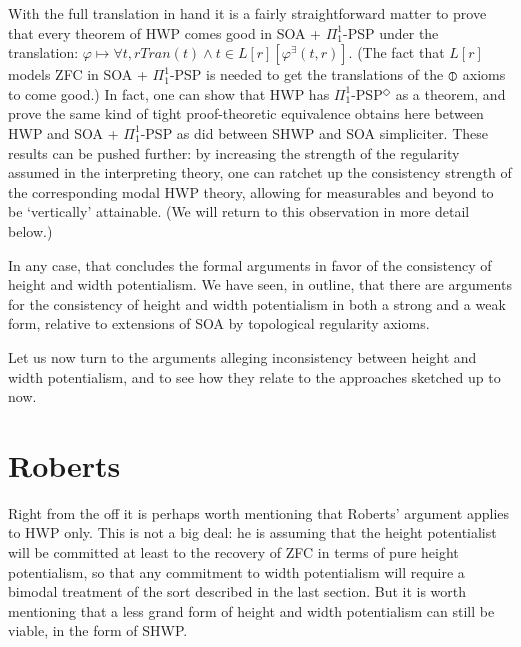 \documentclass{article}
\begin{document}
With the full translation in hand 
it is a fairly straightforward matter to prove that every theorem of HWP 
comes good in SOA + $\Pi_1^1$-PSP under the translation: 
$\varphi \mapsto \forall t, r Tran(t) \wedge t \in L[r][ \varphi^\exists(t, r)]$.
(The fact that $L[r]$ models ZFC
in SOA + $\Pi_1^1$-PSP is needed to get the translations of the $\circledbar$ 
axioms to come good.)
In fact, one can show that HWP has $\Pi_1^1$-PSP$^\Diamond$ as a theorem, and 
prove the same kind of tight proof-theoretic equivalence obtains here 
between HWP and SOA + $\Pi_1^1$-PSP as did between SHWP and SOA simpliciter. 
These results can be pushed further: by increasing the strength of the regularity 
assumed in the interpreting theory, 
one can ratchet up the consistency strength of the corresponding modal HWP 
theory, allowing for measurables and beyond to be `vertically' attainable.
(We will return to this observation in more detail below.)

In any case, that concludes the formal arguments 
in favor of the consistency of height and width potentialism.
We have seen, in outline, that there are arguments for the consistency of 
height and width potentialism in both a strong and a weak form, relative to 
extensions of SOA by topological regularity axioms.

Let us 
now turn to the arguments alleging inconsistency between height and width 
potentialism, and to see how they relate to the approaches sketched up to now.

\section{Roberts}

Right from the off it is perhaps worth mentioning 
that Roberts' argument applies to HWP only. This is not a big deal: 
he is assuming that the height potentialist will be committed at least 
to the recovery of ZFC in terms of pure height potentialism, so that 
any commitment to width potentialism will require a bimodal treatment 
of the sort described in the last section. But it is worth mentioning 
that a less grand form of height and width potentialism can still be viable,
in the form of SHWP.
\end{document}
